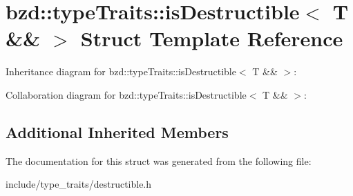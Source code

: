 \hypertarget{structbzd_1_1typeTraits_1_1isDestructible_3_01T_01_6_6_01_4}{}\section{bzd\+:\+:type\+Traits\+:\+:is\+Destructible$<$ T \&\& $>$ Struct Template Reference}
\label{structbzd_1_1typeTraits_1_1isDestructible_3_01T_01_6_6_01_4}


Inheritance diagram for bzd\+:\+:type\+Traits\+:\+:is\+Destructible$<$ T \&\& $>$\+:


Collaboration diagram for bzd\+:\+:type\+Traits\+:\+:is\+Destructible$<$ T \&\& $>$\+:
\subsection*{Additional Inherited Members}


The documentation for this struct was generated from the following file\+:\begin{DoxyCompactItemize}
\item 
include/type\+\_\+traits/destructible.\+h\end{DoxyCompactItemize}
